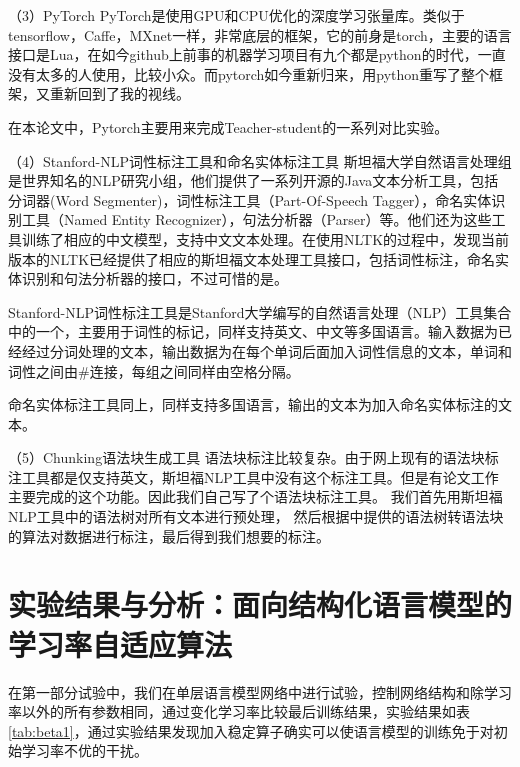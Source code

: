 （3）PyTorch
PyTorch是使用GPU和CPU优化的深度学习张量库。类似于tensorflow，Caffe，MXnet一样，非常底层的框架，它的前身是torch，主要的语言接口是Lua，在如今github上前事的机器学习项目有九个都是python的时代，一直没有太多的人使用，比较小众。而pytorch如今重新归来，用python重写了整个框架，又重新回到了我的视线。

在本论文中，Pytorch主要用来完成Teacher-student的一系列对比实验。


（4）Stanford-NLP词性标注工具和命名实体标注工具
斯坦福大学自然语言处理组是世界知名的NLP研究小组，他们提供了一系列开源的Java文本分析工具，包括分词器(Word Segmenter)，词性标注工具（Part-Of-Speech Tagger），命名实体识别工具（Named Entity Recognizer），句法分析器（Parser）等。他们还为这些工具训练了相应的中文模型，支持中文文本处理。在使用NLTK的过程中，发现当前版本的NLTK已经提供了相应的斯坦福文本处理工具接口，包括词性标注，命名实体识别和句法分析器的接口，不过可惜的是。

Stanford-NLP词性标注工具是Stanford大学编写的自然语言处理（NLP）工具集合中的一个，主要用于词性的标记，同样支持英文、中文等多国语言。输入数据为已经经过分词处理的文本，输出数据为在每个单词后面加入词性信息的文本，单词和词性之间由$\#$连接，每组之间同样由空格分隔。

命名实体标注工具同上，同样支持多国语言，输出的文本为加入命名实体标注的文本。

（5）Chunking语法块生成工具
语法块标注比较复杂。由于网上现有的语法块标注工具都是仅支持英文，斯坦福NLP工具中没有这个标注工具。但是有论文工作主要完成的这个功能。因此我们自己写了个语法块标注工具。
我们首先用斯坦福NLP工具中的语法树对所有文本进行预处理，
然后根据\cite{Tjong2000Introduction}中提供的语法树转语法块的算法对数据进行标注，最后得到我们想要的标注。



\section{实验结果与分析：面向结构化语言模型的学习率自适应算法}
在第一部分试验中，我们在单层语言模型网络中进行试验，控制网络结构和除学习率以外的所有参数相同，通过变化学习率比较最后训练结果，实验结果如表\ref{tab:beta1}，通过实验结果发现加入稳定算子确实可以使语言模型的训练免于对初始学习率不优的干扰。


